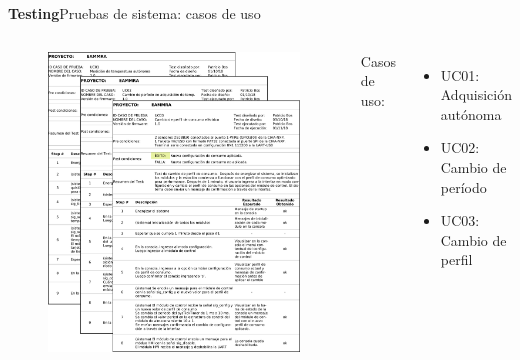 \documentclass[11pt, xcolor={table,xcdraw}]{beamer}
\begin{document}
\begin{frame}{\textbf{\LARGE{Testing}}}{Pruebas de sistema: casos de uso}
	\vspace{-.75cm}
\begin{columns}
  \column{.53\paperwidth}
  \hspace{.5cm}
	\begin{figure}[H]
	  \includegraphics[height=.8\textheight]{./imagenes/UseCase.png}
	\end{figure}	
	\hfill
	\column{.47\paperwidth} 	
	Casos de uso:
	\vspace{5px}
	  \begin{itemize}[]
		  \item UC01: Adquisición autónoma
		  \item UC02: Cambio de período
		  \item UC03: Cambio de perfil
		\end{itemize}
	\end{columns}
\end{frame}
\end{document}
